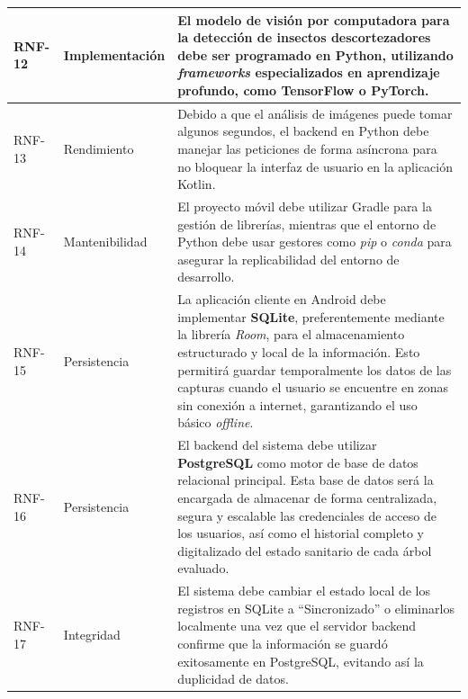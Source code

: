 \begin{longtable}{|>{\centering\arraybackslash}m{1.8cm}|>{\centering\arraybackslash}m{2.5cm}|m{9.5cm}|}
\hline
RNF-12 & Implementación & El modelo de visión por computadora para la detección de insectos descortezadores debe ser programado en Python, utilizando \textit{frameworks} especializados en aprendizaje profundo, como TensorFlow o PyTorch. \\
\hline
RNF-13 & Rendimiento & Debido a que el análisis de imágenes puede tomar algunos segundos, el backend en Python debe manejar las peticiones de forma asíncrona para no bloquear la interfaz de usuario en la aplicación Kotlin. \\
\hline
RNF-14 & Mantenibilidad & El proyecto móvil debe utilizar Gradle para la gestión de librerías, mientras que el entorno de Python debe usar gestores como \textit{pip} o \textit{conda} para asegurar la replicabilidad del entorno de desarrollo. \\
\hline
RNF-15 & Persistencia & La aplicación cliente en Android debe implementar \textbf{SQLite}, preferentemente mediante la librería \textit{Room}, para el almacenamiento estructurado y local de la información. Esto permitirá guardar temporalmente los datos de las capturas cuando el usuario se encuentre en zonas sin conexión a internet, garantizando el uso básico \textit{offline}. \\
\hline
RNF-16 & Persistencia & El backend del sistema debe utilizar \textbf{PostgreSQL} como motor de base de datos relacional principal. Esta base de datos será la encargada de almacenar de forma centralizada, segura y escalable las credenciales de acceso de los usuarios, así como el historial completo y digitalizado del estado sanitario de cada árbol evaluado. \\
\hline
RNF-17 & Integridad & El sistema debe cambiar el estado local de los registros en SQLite a ``Sincronizado'' o eliminarlos localmente una vez que el servidor backend confirme que la información se guardó exitosamente en PostgreSQL, evitando así la duplicidad de datos. \\
\hline
\end{longtable}

